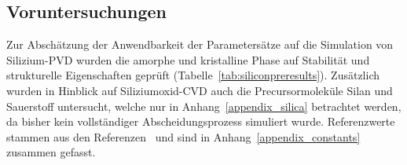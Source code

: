 \subsection{Voruntersuchungen}

Zur Abschätzung der Anwendbarkeit der Parametersätze auf die Simulation von Silizium-PVD wurden die amorphe und kristalline Phase auf Stabilität und strukturelle Eigenschaften geprüft (Tabelle~\ref{tab:siliconpreresults}).
Zusätzlich wurden in Hinblick auf Siliziumoxid-CVD auch die Precursormoleküle Silan und Sauerstoff untersucht, welche nur in Anhang~\ref{appendix_silica} betrachtet werden, da bisher kein vollständiger Abscheidungsprozess simuliert wurde.
Referenzwerte stammen aus den Referenzen~\cite{haynes_crc_2011,remes_optical_1998} und sind in Anhang~\ref{appendix_constants} zusammen gefasst.

